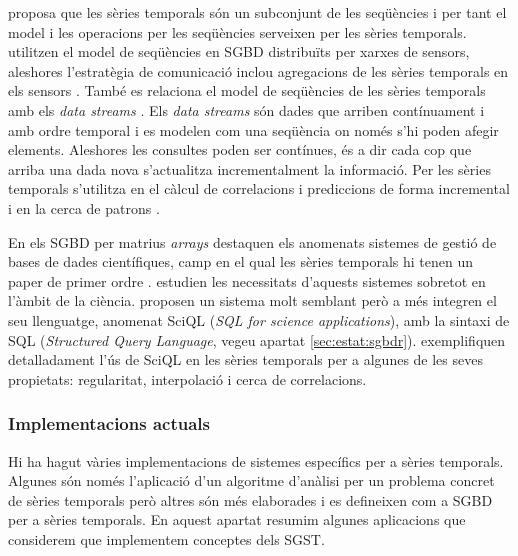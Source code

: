 \textcite{seshadri96:thesis} proposa que les sèries temporals són un subconjunt de les seqüències i per tant el model i les operacions per les seqüències \parencite{seshadri95} serveixen per les sèries temporals. 
\textcite{bonnet01} utilitzen el model de seqüències en SGBD distribuïts per xarxes de sensors, aleshores l'estratègia de comunicació inclou agregacions de les sèries temporals en els sensors \parencite{demers03}.
També es relaciona el model de seqüències de les sèries temporals amb els \emph{data streams} \parencite{babcock02,jagadish95,ogras06}. Els \emph{data streams} són dades que arriben contínuament i amb ordre temporal i es modelen com una seqüència on només s'hi poden afegir elements. Aleshores les consultes poden ser contínues, és a dir cada cop que arriba una dada nova s'actualitza incrementalment la informació. Per les sèries temporals s'utilitza en el càlcul de correlacions i prediccions de forma incremental \parencite{yi00} i en la cerca de patrons \parencite{bai05}.

En els SGBD per matrius \emph{arrays} destaquen els anomenats sistemes
de gestió de bases de dades científiques, camp en el qual les sèries
temporals hi tenen un paper de primer
ordre \parencite{zhang11}. \textcite{stonebraker09:scidb} estudien les
necessitats d'aquests sistemes sobretot en l'àmbit de la
ciència. \textcite{kersten11} proposen un sistema molt semblant però a
més integren el seu llenguatge, anomenat SciQL (\emph{SQL for
  science applications}), amb la sintaxi de SQL (\emph{Structured Query Language},
vegeu apartat \ref{sec:estat:sgbdr}). \textcite{zhang11} exemplifiquen
detalladament l'ús de SciQL en les sèries temporals per a algunes de
les seves propietats: regularitat, interpolació i cerca de
correlacions.



\subsubsection{Implementacions actuals}

Hi ha hagut vàries implementacions de sistemes específics per a sèries
temporals. Algunes són només l'aplicació d'un algoritme d'anàlisi per
un problema concret de sèries temporals però altres són més elaborades
i es defineixen com a SGBD per a sèries temporals.  En aquest apartat
resumim algunes aplicacions que considerem que implementem conceptes
dels SGST.



